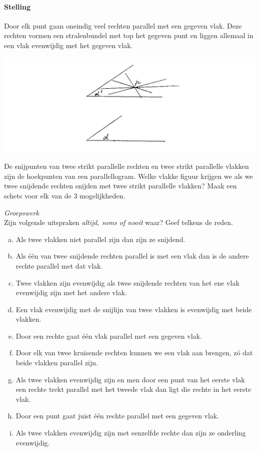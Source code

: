 \documentclass[12pt,twoside]{article}
\begin{document}
\begin{theorie}
\paragraph*{Stelling}
Door elk punt gaan oneindig veel rechten parallel met een gegeven vlak.
Deze rechten vormen een stralenbundel met top het gegeven punt en liggen allemaal in een
vlak evenwijdig met het gegeven vlak.
\begin{center}
  \includegraphics[width=\textwidth]{stelling_17}
\end{center}
\end{theorie}

\begin{oefening}
De snijpunten van twee strikt parallelle rechten en twee strikt parallelle vlakken zijn
de hoekpunten van een parallellogram. Welke vlakke figuur krijgen we als we twee
snijdende rechten snijden met twee strikt parallelle vlakken? Maak een schets voor
elk van de 3 mogelijkheden.
\end{oefening}

\begin{oefening} {\em Groepswerk}\\
Zijn volgende uitspraken {\em altijd, soms of nooit} waar? Geef telkens de reden.
\begin{enumerate}[(a)]
  \item Als twee vlakken niet parallel zijn dan zijn ze snijdend.
  \item Als één van twee snijdende rechten parallel is met een vlak dan is de andere rechte parallel met dat vlak.
  \item Twee vlakken zijn evenwijdig als twee snijdende rechten van het ene vlak evenwijdig zijn met het andere vlak.
  \item Een vlak evenwijdig met de snijlijn van twee vlakken is evenwijdig met beide vlakken.
  \item Door een rechte gaat één vlak parallel met een gegeven vlak.
  \item Door elk van twee kruisende rechten kunnen we een vlak aan brengen, zó dat beide vlakken parallel zijn.
  \item Als twee vlakken evenwijdig zijn en men door een punt van het eerste vlak een rechte trekt parallel met het tweede vlak dan ligt die rechte in het eerste vlak.
  \item Door een punt gaat juist één rechte parallel met een gegeven vlak.
  \item Als twee vlakken evenwijdig zijn met eenzelfde rechte dan zijn ze onderling evenwijdig.
\end{enumerate}
\end{oefening}
\end{document}
